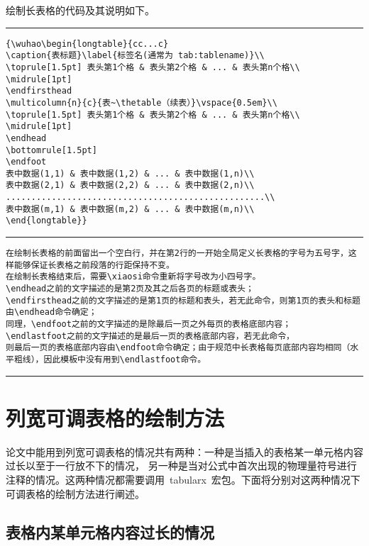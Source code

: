 绘制长表格的代码及其说明如下。
\vspace{1em}\noindent\hrule

\begin{verbatim}
{\wuhao\begin{longtable}{cc...c}
\caption{表标题}\label{标签名(通常为 tab:tablename)}\\
\toprule[1.5pt] 表头第1个格 & 表头第2个格 & ... & 表头第n个格\\ \midrule[1pt]
\endfirsthead
\multicolumn{n}{c}{表~\thetable（续表）}\vspace{0.5em}\\
\toprule[1.5pt] 表头第1个格 & 表头第2个格 & ... & 表头第n个格\\ \midrule[1pt]
\endhead
\bottomrule[1.5pt]
\endfoot
表中数据(1,1) & 表中数据(1,2) & ... & 表中数据(1,n)\\
表中数据(2,1) & 表中数据(2,2) & ... & 表中数据(2,n)\\
...................................................\\
表中数据(m,1) & 表中数据(m,2) & ... & 表中数据(m,n)\\
\end{longtable}}
\end{verbatim}

\noindent\hrule
\begin{verbatim}
在绘制长表格的前面留出一个空白行，并在第2行的一开始全局定义长表格的字号为五号字，这样能够保证长表格之前段落的行距保持不变。
在绘制长表格结束后，需要\xiaosi命令重新将字号改为小四号字。
\endhead之前的文字描述的是第2页及其之后各页的标题或表头；
\endfirsthead之前的文字描述的是第1页的标题和表头，若无此命令，则第1页的表头和标题由\endhead命令确定；
同理，\endfoot之前的文字描述的是除最后一页之外每页的表格底部内容；
\endlastfoot之前的文字描述的是最后一页的表格底部内容，若无此命令，
则最后一页的表格底部内容由\endfoot命令确定；由于规范中长表格每页底部内容均相同（水平粗线），因此模板中没有用到\endlastfoot命令。
\end{verbatim}

\noindent\hrule
\section{列宽可调表格的绘制方法}
论文中能用到列宽可调表格的情况共有两种：一种是当插入的表格某一单元格内容过长以至于一行放不下的情况，
另一种是当对公式中首次出现的物理量符号进行注释的情况。这两种情况都需要调用~tabularx~宏包。下面将分别对这两种情况下可调表格的绘制方法进行阐述。
\subsection{表格内某单元格内容过长的情况}

